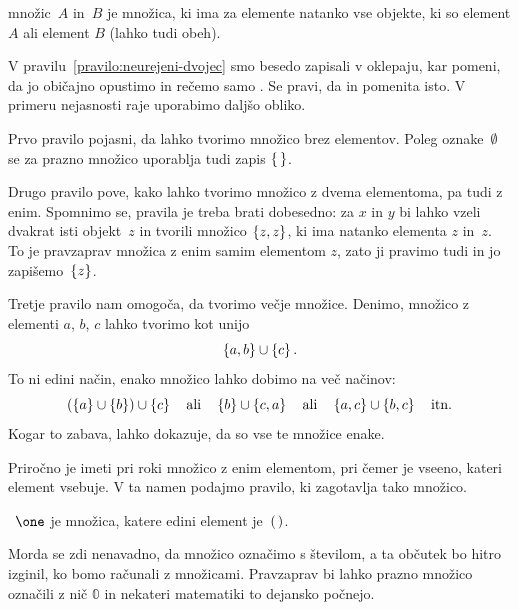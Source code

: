 \begin{pravilo}
  \label{pravilo:unija}
   množic~$A$ in~$B$ je množica, ki ima za elemente
  natanko vse objekte, ki so element $A$ ali element $B$ (lahko tudi obeh).
\end{pravilo}

V pravilu~\ref{pravilo:neurejeni-dvojec} smo besedo  zapisali v oklepaju, kar
pomeni, da jo običajno opustimo in rečemo samo . Se pravi, da  in  pomenita isto. V primeru nejasnosti raje uporabimo daljšo obliko.

Prvo pravilo pojasni, da lahko tvorimo množico brez elementov.
Poleg oznake~$\emptyset$ se za prazno množico uporablja tudi zapis $\left\{\,\right\}$.

Drugo pravilo pove, kako lahko tvorimo množico z dvema elementoma, pa tudi z enim.
Spomnimo se, pravila je treba brati dobesedno: za $x$ in $y$ bi lahko vzeli dvakrat isti
objekt~$z$ in tvorili množico $\left\{z, z\right\}$, ki ima natanko elementa $z$ in~$z$. To je
pravzaprav množica z enim samim elementom $z$, zato ji pravimo tudi  in jo
zapišemo~$\left\{z\right\}$.

Tretje pravilo nam omogoča, da tvorimo večje množice. Denimo, množico z elementi $a$, $b$,
$c$ lahko tvorimo kot unijo
%
\begin{equation*}
  \left\{a, b\right\} \cup \left\{c\right\}.
\end{equation*}
%
To ni edini način, enako množico lahko dobimo na več načinov:
%
\begin{equation*}
  (\left\{a\right\} \cup \left\{b\right\}) \cup \left\{c\right\}
  \quad\text{ali}\quad
  \left\{b\right\} \cup \left\{c, a\right\}
  \quad\text{ali}\quad
  \left\{a,c\right\} \cup \left\{b,c\right\}
  \quad\text{itn.}
\end{equation*}
%
Kogar to zabava, lahko dokazuje, da so vse te množice enake.

Priročno je imeti pri roki množico z enim elementom, pri čemer je vseeno, kateri element vsebuje.
%
V ta namen podajmo pravilo, ki zagotavlja tako množico.

\begin{pravilo}
  \label{pravilo:enojec}
  ~$\one$ je množica, katere edini element je~$(\,)$.
\end{pravilo}

Morda se zdi nenavadno, da množico označimo s številom, a ta občutek bo hitro izginil, ko
bomo računali z množicami. Pravzaprav bi lahko prazno množico označili z nič $\mathbb{0}$
in nekateri matematiki to dejansko počnejo.

